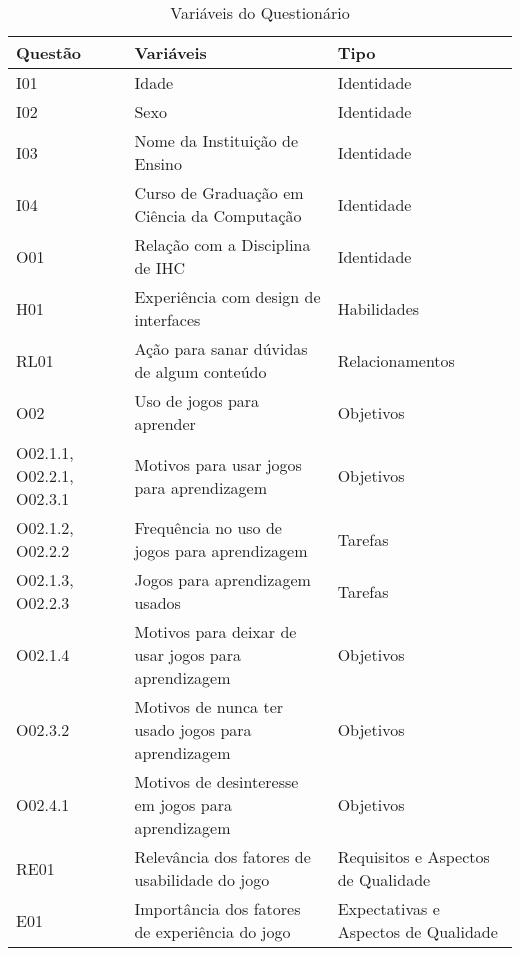 \begin{table}[htbp]
\centering
\caption{Variáveis do Questionário}
\label{tab:Table_variaveis-quest}
\begin{tabular}{|p{1.6cm}|p{9.5cm}|p{4cm}|}
\hline
\textbf{Questão} & \textbf{Variáveis}                         &  \textbf{Tipo }         \\ \hline
I01  & Idade                                      &  Identidade                         \\ \hline
I02 & Sexo                                       &  Identidade                             \\ \hline
I03  &  Nome da Instituição de Ensino              &  Identidade                               \\ \hline
I04 & Curso de Graduação em Ciência da Computação &  Identidade                             \\ \hline
O01   &  Relação com a Disciplina de IHC             & Identidade                               \\ \hline
H01   &  Experiência com design de interfaces        & Habilidades                               \\ \hline
RL01   &  Ação para sanar dúvidas de algum conteúdo   & Relacionamentos                         \\ \hline
O02  &  Uso de jogos para aprender                 & Objetivos                        \\ \hline
O02.1.1, O02.2.1, O02.3.1   &  Motivos para usar jogos para aprendizagem                 & Objetivos    \\ \hline
O02.1.2, O02.2.2   &  Frequência no uso de jogos para aprendizagem               & Tarefas              \\ \hline
O02.1.3, O02.2.3   &  Jogos para aprendizagem usados              & Tarefas             \\ \hline
O02.1.4  & Motivos para deixar de usar jogos para aprendizagem       & Objetivos                      \\ \hline
O02.3.2  &  Motivos de nunca ter usado jogos para aprendizagem        & Objetivos                     \\ \hline
O02.4.1  & Motivos de desinteresse em jogos para aprendizagem   & Objetivos                \\ \hline
RE01  & Relevância dos fatores de usabilidade do jogo             & Requisitos e Aspectos de Qualidade                        \\ \hline
E01   & Importância dos fatores de experiência do jogo            & Expectativas e Aspectos de Qualidade                          \\ \hline
\end{tabular}
\end{table}